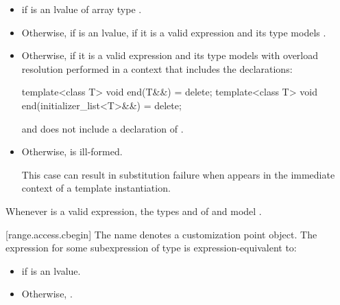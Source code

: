 \begin{itemize}
\item
   if  is an lvalue of array
  type .

\item
  Otherwise, if  is an lvalue,
  if it is a valid expression and its type  models
  .

\item
  Otherwise,  if it is a valid
  expression and its type  models
   with overload
  resolution performed in a context that includes the declarations:
  \begin{codeblock}
  template<class T> void end(T&&) = delete;
  template<class T> void end(initializer_list<T>&&) = delete;
  \end{codeblock}

  and does not include a declaration of .

\item
  Otherwise,  is ill-formed.
  \begin{note}
  This case can result in substitution failure when 
  appears in the immediate context of a template instantiation.
  \end{note}
\end{itemize}

\pnum
\begin{note}
Whenever  is a valid expression,
the types  and  of
 and 
model .
\end{note}

[range.access.cbegin]{}
\pnum
The name  denotes a customization point
object. The expression
 for some subexpression  of type 
is expression-equivalent to:
\begin{itemize}
\item {} if  is an lvalue.
\item Otherwise, .
\end{itemize}

